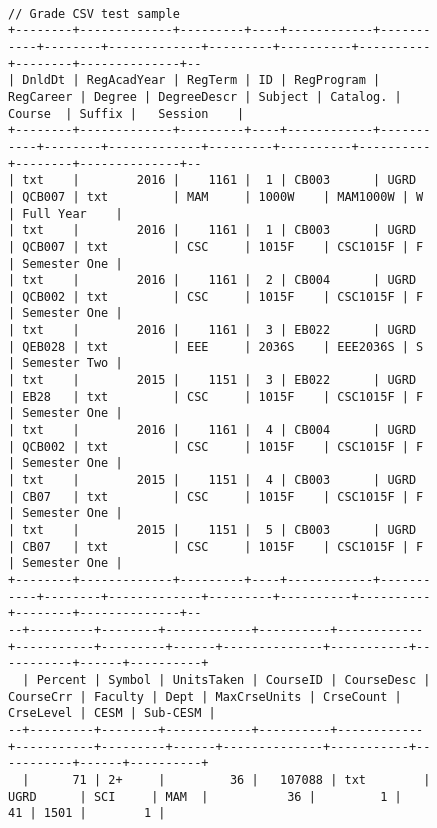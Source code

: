 \begin{figure}[H]
    \centering
    \begin{mdframed}[rightline=true,leftline=true]
        \centering
        \begin{BVerbatim}[fontsize=\tiny]

// Grade CSV test sample
+--------+-------------+---------+----+------------+-----------+--------+-------------+---------+----------+----------+--------+--------------+--
| DnldDt | RegAcadYear | RegTerm | ID | RegProgram | RegCareer | Degree | DegreeDescr | Subject | Catalog. |  Course  | Suffix |   Session    |
+--------+-------------+---------+----+------------+-----------+--------+-------------+---------+----------+----------+--------+--------------+--
| txt    |        2016 |    1161 |  1 | CB003      | UGRD      | QCB007 | txt         | MAM     | 1000W    | MAM1000W | W      | Full Year    |
| txt    |        2016 |    1161 |  1 | CB003      | UGRD      | QCB007 | txt         | CSC     | 1015F    | CSC1015F | F      | Semester One |
| txt    |        2016 |    1161 |  2 | CB004      | UGRD      | QCB002 | txt         | CSC     | 1015F    | CSC1015F | F      | Semester One |
| txt    |        2016 |    1161 |  3 | EB022      | UGRD      | QEB028 | txt         | EEE     | 2036S    | EEE2036S | S      | Semester Two |
| txt    |        2015 |    1151 |  3 | EB022      | UGRD      | EB28   | txt         | CSC     | 1015F    | CSC1015F | F      | Semester One |
| txt    |        2016 |    1161 |  4 | CB004      | UGRD      | QCB002 | txt         | CSC     | 1015F    | CSC1015F | F      | Semester One |
| txt    |        2015 |    1151 |  4 | CB003      | UGRD      | CB07   | txt         | CSC     | 1015F    | CSC1015F | F      | Semester One |
| txt    |        2015 |    1151 |  5 | CB003      | UGRD      | CB07   | txt         | CSC     | 1015F    | CSC1015F | F      | Semester One |
+--------+-------------+---------+----+------------+-----------+--------+-------------+---------+----------+----------+--------+--------------+--
--+---------+--------+------------+----------+------------+-----------+---------+------+--------------+-----------+-----------+------+----------+
  | Percent | Symbol | UnitsTaken | CourseID | CourseDesc | CourseCrr | Faculty | Dept | MaxCrseUnits | CrseCount | CrseLevel | CESM | Sub-CESM |
--+---------+--------+------------+----------+------------+-----------+---------+------+--------------+-----------+-----------+------+----------+
  |      71 | 2+     |         36 |   107088 | txt        | UGRD      | SCI     | MAM  |           36 |         1 |        41 | 1501 |        1 |

\end{BVerbatim}
\end{mdframed}
\end{figure}
